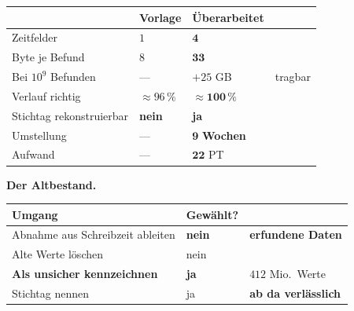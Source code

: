 \begin{merksatz}
\begin{center}
{\small
\renewcommand{\arraystretch}{1.45}
\begin{tabular}{@{}P{2.8cm}P{2.0cm}P{2.2cm}P{2.0cm}@{}}
\toprule
& \textbf{Vorlage} & \textbf{Überarbeitet} & \\
\midrule
Zeitfelder & $1$ & $\mathbf{4}$ & \\
Byte je Befund & $8$ & $\mathbf{33}$ & \\
Bei $10^9$ Befunden & --- & \textcolor{mittel}{$+25$ GB} & \textcolor{gruen}{tragbar}\\
Verlauf richtig & $\approx96\,\%$ & \textcolor{gruen}{$\approx\mathbf{100\,\%}$} & \\
Stichtag rekonstruierbar & \textcolor{akzent}{\textbf{nein}} & \textcolor{gruen}{\textbf{ja}} & \\
Umstellung & --- & \textcolor{akzent}{$\mathbf{9}$ \textbf{Wochen}} & \\
Aufwand & --- & $\mathbf{22}$ PT & \\
\bottomrule
\end{tabular}}
\end{center}

\begin{center}
\begin{minipage}{0.88\textwidth}
\end{minipage}
\end{center}

\textbf{Der Altbestand.}

\begin{center}
\renewcommand{\arraystretch}{1.45}
\begin{tabular}{@{}P{3.0cm}P{2.2cm}P{2.6cm}@{}}
\toprule
\textbf{Umgang} & \textbf{Gewählt?} & \\
\midrule
Abnahme aus Schreibzeit ableiten & \textcolor{akzent}{\textbf{nein}} & \textcolor{akzent}{\textbf{erfundene Daten}}\\
Alte Werte löschen & \textcolor{akzent}{nein} & \\
\textbf{Als unsicher kennzeichnen} & \textcolor{gruen}{\textbf{ja}} & \textcolor{gruen}{$412$ Mio.\ Werte}\\
Stichtag nennen & \textcolor{gruen}{ja} & \textbf{ab da verlässlich}\\
\bottomrule
\end{tabular}
\end{center}

\begin{center}
\end{center}
\end{merksatz}

